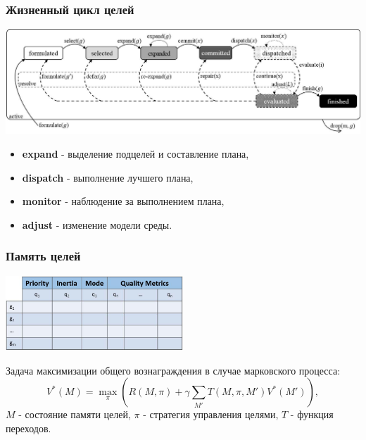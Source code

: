 \documentclass[default]{beamer}
\begin{document}
	\begin{frame}
		\frametitle{Жизненный цикл целей}
		
		\centering		
		\includegraphics[width=\textwidth]{goal_lifecycle.jpg}
		\begin{itemize}
			\item \textbf{expand} - выделение подцелей и составление плана,
			\item \textbf{dispatch} - выполнение лучшего плана,
			\item \textbf{monitor} - наблюдение за выполнением плана,
			\item \textbf{adjust} - изменение модели среды.
		\end{itemize}
	\end{frame}

	\begin{frame}
		\frametitle{Память целей}
		
		\centering		
		\includegraphics[width=0.5\textwidth]{goal_mem.jpg}
		\par\bigskip
		Задача максимизации общего вознаграждения в случае марковского процесса:
		\[
			V^*(M)=\max_\pi(R(M,\pi)+\gamma\sum_{M'}T(M,\pi,M')V^*(M')),
		\]
		$M$ - состояние памяти целей, $\pi$ - стратегия управления целями, $T$ - функция переходов.
	\end{frame}
\end{document}
